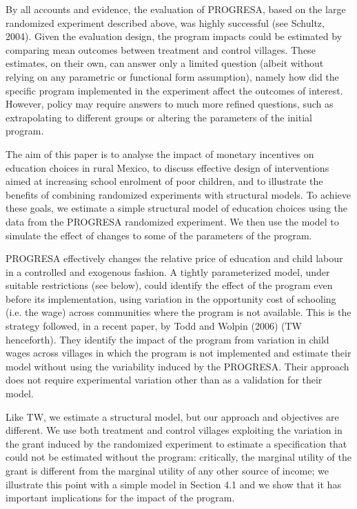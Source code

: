 \documentclass{handoutForSolutions}
\begin{document}
By all accounts and evidence, the evaluation of PROGRESA, based on the large randomized experiment described above, was highly successful (see Schultz, 2004). Given the evaluation design, the program impacts could be estimated by comparing mean outcomes between treatment and control villages. These estimates, on their own, can answer only a limited question (albeit without relying on any parametric or functional form assumption), namely how did the specific program implemented in the experiment affect the outcomes of interest. However, policy may require answers to much more refined questions, such as extrapolating to different groups or altering the parameters of the initial program.

The aim of this paper is to analyse the impact of monetary incentives on education choices in rural Mexico, to discuss effective design of interventions aimed at increasing school enrolment of poor children, and to illustrate the benefits of combining randomized experiments with structural models. To achieve these goals, we estimate a simple structural model of education choices using the data from the PROGRESA randomized experiment. We then use the model to simulate the effect of changes to some of the parameters of the program.

PROGRESA effectively changes the relative price of education and child labour in a controlled and exogenous fashion. A tightly parameterized model, under suitable restrictions (see below), could identify the effect of the program even before its implementation, using variation in the opportunity cost of schooling (i.e. the wage) across communities where the program is not available. This is the strategy followed, in a recent paper, by Todd and Wolpin (2006) (TW henceforth). They identify the impact of the program from variation in child wages across villages in which the program is not implemented and estimate their model without using the variability induced by the PROGRESA. Their approach does not require experimental variation other than as a validation for their model.

Like TW, we estimate a structural model, but our approach and objectives are different. We use both treatment and control villages exploiting the variation in the grant induced by the randomized experiment to estimate a specification that could not be estimated without the program: critically, the marginal utility of the grant is different from the marginal utility of any other source of income; we illustrate this point with a simple model in Section 4.1 and we show that it has important implications for the impact of the program.
\end{document}
